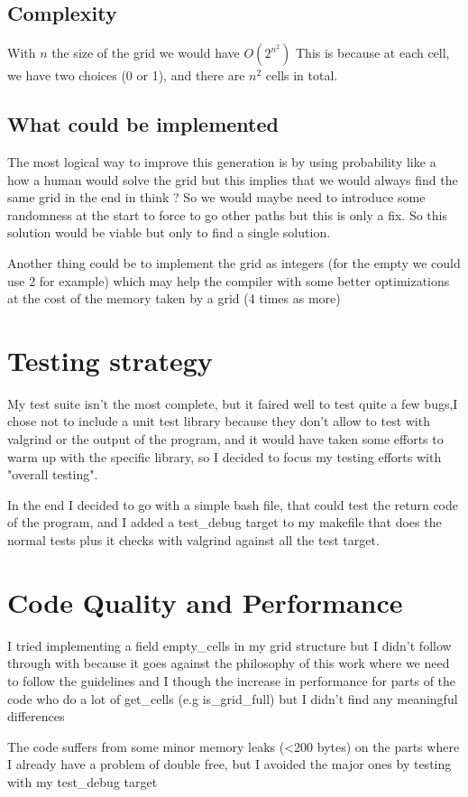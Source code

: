 \documentclass{article}
\begin{document}
\subsection{Complexity}
With $n$ the size of the grid we would have $O(2^{n^2})$
This is because at each cell, we have two choices (0 or 1), and there are $n^2$ cells in total. 

\subsection{What could be implemented}

The most logical way to improve this generation is by using probability like a how a human would solve the grid
but this implies that we would always find the same grid in the end in think ? So we would maybe need to introduce some 
randomness at the start to force to go other paths but this is only a fix. So this solution would be viable but only to find a single solution.

Another thing could be to implement the grid as integers (for the empty we could use 2 for example) which may help the compiler with some better optimizations at the cost of the memory taken by a grid (4 times as more)

\section{Testing strategy}

My test suite isn't the most complete, but it faired well to test quite a few bugs,I chose not to include a unit test library because they don't allow to test with valgrind
or the output of the program, and it would have taken some efforts to warm up with the specific library, so I decided to focus my testing efforts with "overall testing".

In the end I decided to go with a simple bash file, that could test the return code of the program, and I added a test\_debug target to my makefile that does the normal tests plus it
checks with valgrind against all the test target.

\section{Code Quality and Performance}
I tried implementing a field empty\_cells in my grid structure but I didn't follow through with because it goes against the philosophy of this work where we need to follow the guidelines
and I though the increase in performance for parts of the code who do a lot of get\_cells (e.g is\_grid\_full) but I didn't find any meaningful differences

The code suffers from some minor memory leaks (<200 bytes) on the parts where I already have a problem of double free, but I avoided the major ones by testing with my test\_debug target
\end{document}
